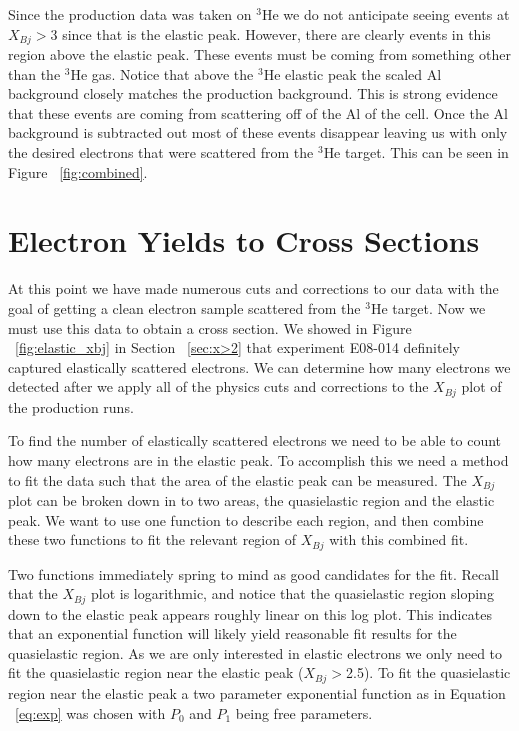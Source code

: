 Since the production data was taken on $^3$He we do not anticipate seeing events at $X_{Bj} > 3$ since that is the elastic peak. However, there are clearly events in this region above the elastic peak. These events must be coming from something other than the $^3$He gas. Notice that above the $^3$He elastic peak the scaled Al background closely matches the production background. This is strong evidence that these events are coming from scattering off of the Al of the cell. Once the Al background is subtracted out most of these events disappear leaving us with only the desired electrons that were scattered from the $^3$He target. This can be seen in Figure ~\ref{fig:combined}.

\section{Electron Yields to Cross Sections}
\label{sec:yield}

At this point we have made numerous cuts and corrections to our data with the goal of getting a clean electron sample scattered from the $^3$He target. Now we must use this data to obtain a cross section. We showed in Figure ~\ref{fig:elastic_xbj} in Section ~\ref{sec:x>2} that experiment E08-014 definitely captured elastically scattered electrons. We can determine how many electrons we detected after we apply all of the physics cuts and corrections to the $X_{Bj}$ plot of the production runs.

To find the number of elastically scattered electrons we need to be able to count how many electrons are in the elastic peak. To accomplish this we need a method to fit the data such that the area of the elastic peak can be measured. The $X_{Bj}$ plot can be broken down in to two areas, the quasielastic region and the elastic peak. We want to use one function to describe each region, and then combine these two functions to fit the relevant region of $X_{Bj}$ with this combined fit. 

Two functions immediately spring to mind as good candidates for the fit. Recall that the $X_{Bj}$ plot is logarithmic, and notice that the quasielastic region sloping down to the elastic peak appears roughly linear on this log plot. This indicates that an exponential function will likely yield reasonable fit results for the quasielastic region. As we are only interested in elastic electrons we only need to fit the quasielastic region near the elastic peak ($X_{Bj}>$2.5). To fit the quasielastic region near the elastic peak a two parameter exponential function as in Equation ~\ref{eq:exp} was chosen with $P_0$ and $P_1$ being free parameters.

